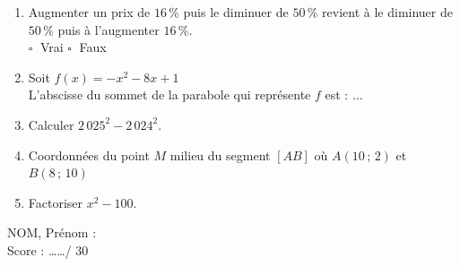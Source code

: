 \documentclass[a4paper,11pt,landscape,exos]{nsi} %
\begin{document}
\begin{multicols}{2}
\begin{enumerate}[]
	\item Augmenter un prix de $16\,\%$ puis le  diminuer de $50\,\%$ revient à le
    diminuer de $50\,\%$  puis à l’augmenter $16\,\%$.\\	$\square\;$ Vrai \qquad $\square\;$ Faux\qquad 
	\item Soit $f(x)=-x^2-8x+1$\\
    L'abscisse du sommet de la parabole qui représente $f$ est : $\ldots$

    \item Calculer $2\,025^2-2\,024^2$.
    \item Coordonnées du point $M$ milieu du segment $[AB]$ où $A(10\,;\,2)$ et $B(8\,;\,10)$
    
	\item  Factoriser  $x^2-100$.
\end{enumerate}
\vfill\null
\columnbreak
NOM, Prénom :  \\

Score : \ldots\ldots / 30
\end{multicols}

\newpage
\end{document}
